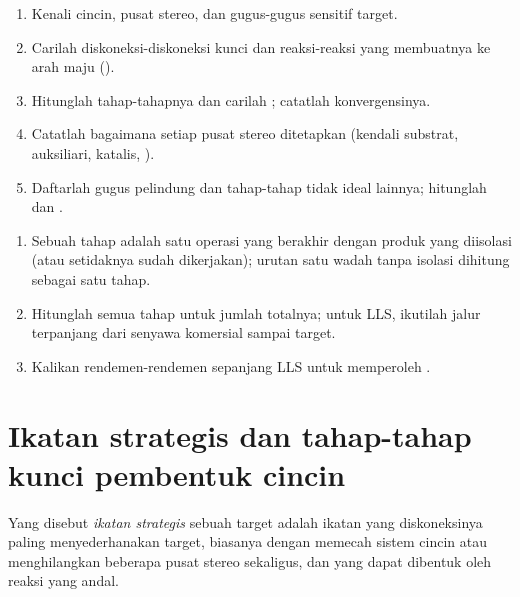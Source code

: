 \begin{method}\label{met:b3:total-synthesis:analyse}
\begin{enumerate}
  \item Kenali cincin, pusat stereo, dan gugus-gugus sensitif target.
  \item Carilah diskoneksi-diskoneksi kunci dan reaksi-reaksi yang membuatnya ke arah
        maju ().
  \item Hitunglah tahap-tahapnya dan carilah ; catatlah konvergensinya.
  \item Catatlah bagaimana setiap pusat stereo ditetapkan (kendali substrat, auksiliari, katalis,
        ).
  \item Daftarlah gugus pelindung dan tahap-tahap tidak ideal lainnya; hitunglah  dan .
\end{enumerate}
\end{method}

\begin{method}\label{met:b3:total-synthesis:count}
\begin{enumerate}
  \item Sebuah tahap adalah satu operasi yang berakhir dengan produk yang diisolasi (atau setidaknya sudah dikerjakan);
        urutan satu wadah tanpa isolasi dihitung sebagai satu tahap.
  \item Hitunglah semua tahap untuk jumlah totalnya; untuk LLS, ikutilah jalur terpanjang dari
        senyawa komersial sampai target.
  \item Kalikan rendemen-rendemen sepanjang LLS untuk memperoleh .
\end{enumerate}
\end{method}

\section{Ikatan strategis dan tahap-tahap kunci pembentuk cincin}

\begin{definition}\label{def:b3:total-synthesis:strategic-bond}
Yang disebut \emph{ikatan strategis} sebuah target adalah ikatan yang
diskoneksinya paling menyederhanakan target, biasanya dengan memecah sistem cincin
atau menghilangkan beberapa pusat stereo sekaligus, dan yang dapat dibentuk oleh reaksi yang
andal.
\end{definition}

